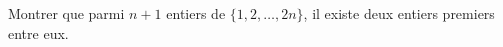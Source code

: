 Montrer que parmi $n + 1$ entiers de $\{1, 2, \ldots, 2n\}$, il existe deux entiers premiers entre eux.
